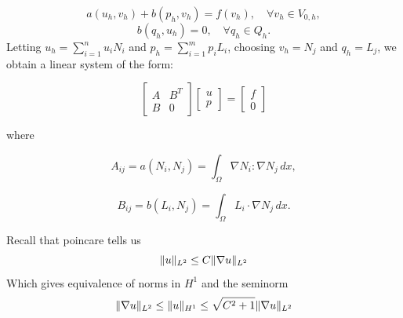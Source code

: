\documentclass[a4paper,12pt]{article}
\theoremstyle{exerciseStyle}
\theoremstyle{solutionStyle}
\DeclarePairedDelimiter\norm{\lVert}{\rVert}%
\begin{document}
\begin{solution}{6.1}
        \begin{equation}
            a(u_h, v_h) + b(p_h, v_h) = f(v_h), \quad \forall v_h \in V_{0,h},
            \tag{6.5}
        \end{equation}
        \begin{equation}
            b(q_h, u_h) = 0, \quad \forall q_h \in Q_h.
            \tag{6.6}
        \end{equation}
        Letting \( u_h = \sum_{i=1}^{n} u_i N_i \) and \( p_h = \sum_{i=1}^{m} p_i L_i \), choosing \( v_h = N_j \) and \( q_h = L_j \), we obtain a linear system of the form:


        \begin{equation}
            \begin{bmatrix}
                A & B^T \\
                B & 0
            \end{bmatrix}
            \begin{bmatrix}
                u \\
                p
            \end{bmatrix}
            =
            \begin{bmatrix}
                f \\
                0
            \end{bmatrix}
            \tag{6.7}
        \end{equation}

        where

        \begin{equation}
            A_{ij} = a(N_i, N_j) = \int_{\Omega} \nabla N_i : \nabla N_j \, dx,
            \tag{6.8}
        \end{equation}


        \begin{equation*}
            B_{ij} = b(L_i, N_j) = \int_{\Omega}  L_i \cdot  \nabla N_j \, dx.
            \tag{6.9}
        \end{equation*}
    \fi


    Recall that poincare tells us
    \begin{equation*}
        \norm{u}_{L^2} \leq C \norm{\nabla u}_{L^2}
    \end{equation*}
    Which gives equivalence of norms in \( H^1 \) and the seminorm
    \begin{equation*}
        \norm{\nabla u}_{L^2} \leq \norm{u}_{H^1} \leq \sqrt{C^2+1} \norm{\nabla u}_{L^2}
    \end{equation*}



\end{solution}
\end{document}
